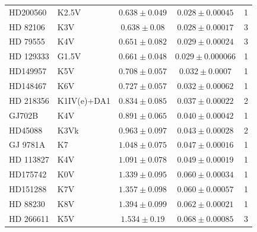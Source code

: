 \begin{subappendices}
\begin{longtable}{l l c c c}
HD200560 & K2.5V & $0.638 \pm 0.049$ & $0.028 \pm 0.00045$ & 1 \\
HD  82106 & K3V & $0.638 \pm 0.08$ & $0.028 \pm 0.00017$ & 3 \\
HD 79555 & K4V & $0.651 \pm 0.082$ & $0.029 \pm 0.00024$ & 3 \\
HD 129333 & G1.5V & $0.661 \pm 0.048$ & $0.029 \pm 0.000066$ & 1 \\
HD149957 & K5V & $0.708 \pm 0.057$ & $0.032 \pm 0.0007$ & 1 \\
HD148467 & K6V & $0.727 \pm 0.057$ & $0.032 \pm 0.00062$ & 1 \\
HD 218356 & K1IV(e)+DA1 & $0.834 \pm 0.085$ & $0.037 \pm 0.00022$ & 2 \\
GJ702B & K4V & $0.891 \pm 0.065$ & $0.040 \pm 0.00042$ & 1 \\
HD45088 & K3Vk & $0.963 \pm 0.097$ & $0.043 \pm 0.00028$ & 2 \\
GJ 9781A & K7 & $1.048 \pm 0.075$ & $0.047 \pm 0.00016$ & 1 \\
HD 113827 & K4V & $1.091 \pm 0.078$ & $0.049 \pm 0.00019$ & 1 \\
HD175742 & K0V & $1.339 \pm 0.095$ & $0.060 \pm 0.00034$ & 1 \\
HD151288 & K7V & $1.357 \pm 0.098$ & $0.060 \pm 0.00057$ & 1 \\
HD 88230 & K8V & $1.394 \pm 0.099$ & $0.062 \pm 0.00021$ & 1 \\
HD 266611 & K5V & $1.534 \pm 0.19$ & $0.068 \pm 0.00085$ & 3 \\
\end{longtable}


\end{subappendices}
